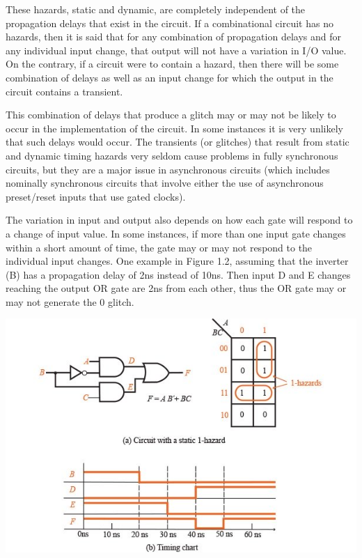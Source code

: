 \documentclass[12pt]{article}
\begin{document}
These hazards, static and dynamic, are completely independent of the propagation delays that exist in the circuit. If a combinational circuit has no hazards, then it is said that for any combination of propagation delays and for any individual input change, that output will not have a variation in I/O value. On the contrary, if a circuit were to contain a hazard, then there will be some combination of delays as well as an input change for which the output in the circuit contains a transient.

This combination of delays that produce a glitch may or may not be likely to occur in the implementation of the circuit. In some instances it is very unlikely that such delays would occur. The transients (or glitches) that result from static and dynamic timing hazards very seldom cause problems in fully synchronous circuits, but they are a major issue in asynchronous circuits (which includes nominally synchronous circuits that involve either the use of asynchronous preset/reset inputs that use gated clocks).

The variation in input and output also depends on how each gate will respond to a change of input value. In some instances, if more than one input gate changes within a short amount of time, the gate may or may not respond to the individual input changes. One example in Figure 1.2, assuming that the inverter (B) has a propagation delay of 2ns instead of 10ns. Then input D and E changes reaching the output OR gate are 2ns from each other, thus the OR gate may or may not generate the 0 glitch. 



\begin{center}
	\includegraphics[scale=0.8]{./static-hazard-timing-chart.jpg}
\end{center}
\end{document}
